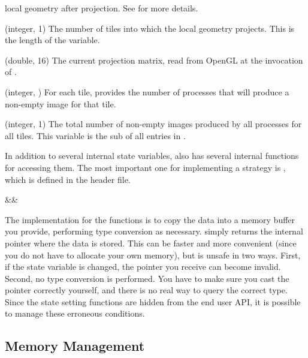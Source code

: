 \begin{Description}[xxxxxxxx]
  local geometry after projection.  See 
  for more details.
\item[\CEnum{ICET\_NUM\_CONTAINED\_TILES}] (integer, 1) The number of tiles
  into which the local geometry projects.  This is the length of the
   variable.
\item[\CEnum{ICET\_PROJECTION\_MATRIX}] (double, 16) The current projection
  matrix, read from OpenGL at the invocation of .
\item[\CEnum{ICET\_TILE\_CONTRIB\_COUNTS}] (integer,
  ) For each tile, provides the number of processes
  that will produce a non-empty image for that tile.
\item[\CEnum{ICET\_TOTAL\_IMAGE\_COUNT}] (integer, 1) The total number of
  non-empty images produced by all processes for all tiles.  This variable
  is the sub of all entries in .
\end{Description}

\label{manpage:icetUnsafeStateGet}
In addition to several internal state variables, \IceT also has several
internal functions for accessing them.  The most important one for
implementing a strategy is , which is defined in
the  header file.

\begin{Table}{3}
  \textC{(}&&\quad\textC{);}
\end{Table}

The implementation for the  functions is to copy the data
into a memory buffer you provide, performing type conversion as necessary.
 simply returns the internal pointer where the
data is stored.  This can be faster and more convenient (since you do not
have to allocate your own memory), but is unsafe in two ways.  First, if
the state variable is changed, the pointer you receive can become invalid.
Second, no type conversion is performed.  You have to make sure you cast
the pointer correctly yourself, and there is no real way to query the
correct type.  Since the state setting functions are hidden from the end
user API, it is possible to manage these erroneous conditions.

\subsection{Memory Management}

